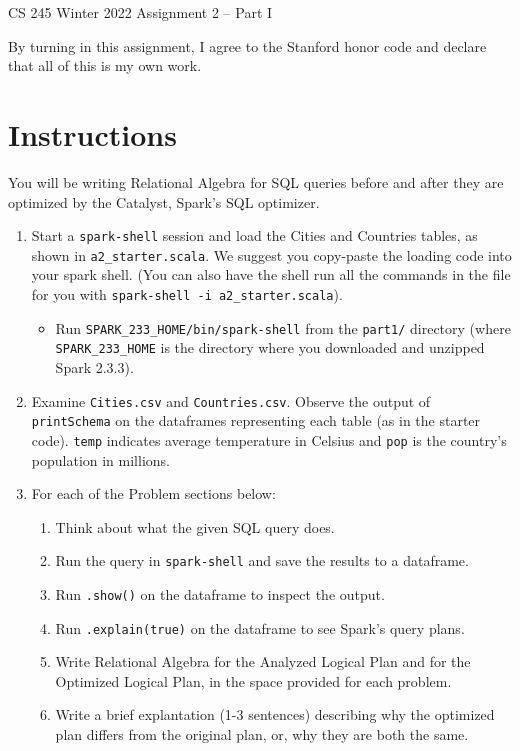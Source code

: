 \documentclass[12pt]{article}
\begin{document}
\begin{center}
{\Large CS 245 Winter 2022 Assignment 2 -- Part I}
\end{center}

By turning in this assignment, I agree to the Stanford honor code and declare
that all of this is my own work.

\section*{Instructions}
You will be writing Relational Algebra for SQL queries before and after
they are optimized by the Catalyst, Spark's SQL optimizer.

\begin{enumerate}
    \item Start a \texttt{spark-shell} session and load the Cities and Countries
        tables, as shown in \texttt{a2\_starter.scala}.
        We suggest you copy-paste the loading code into your spark shell.
        (You can also have the shell run all the commands in the file
        for you with \texttt{spark-shell -i a2\_starter.scala}).
    \begin{itemize}
        \item Run \texttt{SPARK\_233\_HOME/bin/spark-shell}
        from the \texttt{part1/} directory
        (where \\
        \texttt{SPARK\_233\_HOME} is the directory where you
        downloaded and unzipped Spark 2.3.3).

    \end{itemize}

    \item Examine \texttt{Cities.csv} and \texttt{Countries.csv}.
        Observe the output of \texttt{printSchema} on the dataframes
        representing each table (as in the starter code).
        \texttt{temp} indicates average temperature in Celsius and
        \texttt{pop} is the country's population in millions.
    \item For each of the Problem sections below:
    \begin{enumerate}
        \item Think about what the given SQL query does.
        \item Run the query in \texttt{spark-shell} and save the results to a dataframe.
        \item Run \texttt{.show()} on the dataframe to inspect the output.
        \item Run \texttt{.explain(true)} on the dataframe to see Spark's
            query plans.
        \item Write Relational Algebra for the Analyzed Logical Plan
            and for the Optimized Logical Plan, in the space provided
            for each problem.
        \item Write a brief explantation (1-3 sentences) describing why the optimized
            plan differs from the original plan, or, why they are both the same.
    \end{enumerate}
\end{enumerate}
\end{document}
